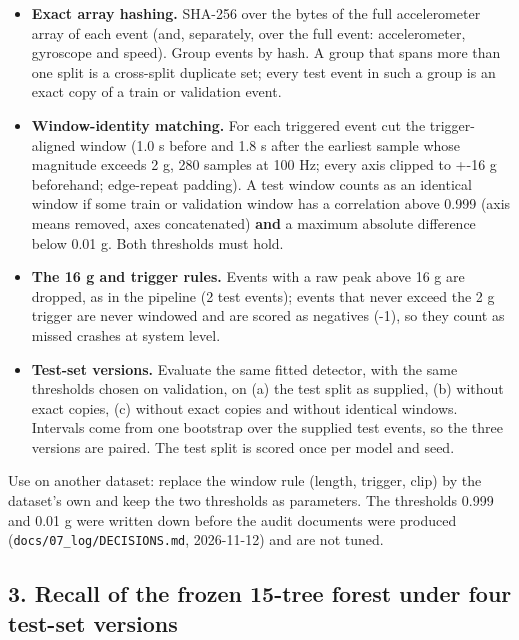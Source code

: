 \begin{itemize}
\item \textbf{Exact array hashing.} SHA-256 over the bytes of the full accelerometer array of each event (and, separately, over the full event: accelerometer, gyroscope and speed). Group events by hash. A group that spans more than one split is a cross-split duplicate set; every test event in such a group is an exact copy of a train or validation event.
\item \textbf{Window-identity matching.} For each triggered event cut the trigger-aligned window (1.0 s before and 1.8 s after the earliest sample whose magnitude exceeds 2 g, 280 samples at 100 Hz; every axis clipped to +-16 g beforehand; edge-repeat padding). A test window counts as an identical window if some train or validation window has a correlation above 0.999 (axis means removed, axes concatenated) \textbf{and} a maximum absolute difference below 0.01 g. Both thresholds must hold.
\item \textbf{The 16 g and trigger rules.} Events with a raw peak above 16 g are dropped, as in the pipeline (2 test events); events that never exceed the 2 g trigger are never windowed and are scored as negatives (-1), so they count as missed crashes at system level.
\item \textbf{Test-set versions.} Evaluate the same fitted detector, with the same thresholds chosen on validation, on (a) the test split as supplied, (b) without exact copies, (c) without exact copies and without identical windows. Intervals come from one bootstrap over the supplied test events, so the three versions are paired. The test split is scored once per model and seed.
\end{itemize}

Use on another dataset: replace the window rule (length, trigger, clip) by the dataset's own and keep the two thresholds as parameters. The thresholds 0.999 and 0.01 g were written down before the audit documents were produced (\texttt{docs/07\_log/DECISIONS.md}, 2026-11-12) and are not tuned.

\subsection*{3. Recall of the frozen 15-tree forest under four test-set versions}

